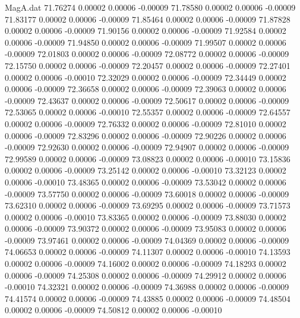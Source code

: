 \begin{filecontents}{MagA.dat}
  71.76274    0.00002    0.00006   -0.00009
  71.78580    0.00002    0.00006   -0.00009
  71.83177    0.00002    0.00006   -0.00009
  71.85464    0.00002    0.00006   -0.00009
  71.87828    0.00002    0.00006   -0.00009
  71.90156    0.00002    0.00006   -0.00009
  71.92584    0.00002    0.00006   -0.00009
  71.94850    0.00002    0.00006   -0.00009
  71.99507    0.00002    0.00006   -0.00009
  72.01803    0.00002    0.00006   -0.00009
  72.08772    0.00002    0.00006   -0.00009
  72.15750    0.00002    0.00006   -0.00009
  72.20457    0.00002    0.00006   -0.00009
  72.27401    0.00002    0.00006   -0.00010
  72.32029    0.00002    0.00006   -0.00009
  72.34449    0.00002    0.00006   -0.00009
  72.36658    0.00002    0.00006   -0.00009
  72.39063    0.00002    0.00006   -0.00009
  72.43637    0.00002    0.00006   -0.00009
  72.50617    0.00002    0.00006   -0.00009
  72.53065    0.00002    0.00006   -0.00010
  72.55357    0.00002    0.00006   -0.00009
  72.64557    0.00002    0.00006   -0.00009
  72.76332    0.00002    0.00006   -0.00009
  72.81010    0.00002    0.00006   -0.00009
  72.83296    0.00002    0.00006   -0.00009
  72.90226    0.00002    0.00006   -0.00009
  72.92630    0.00002    0.00006   -0.00009
  72.94907    0.00002    0.00006   -0.00009
  72.99589    0.00002    0.00006   -0.00009
  73.08823    0.00002    0.00006   -0.00010
  73.15836    0.00002    0.00006   -0.00009
  73.25142    0.00002    0.00006   -0.00010
  73.32123    0.00002    0.00006   -0.00010
  73.48365    0.00002    0.00006   -0.00009
  73.53042    0.00002    0.00006   -0.00009
  73.57750    0.00002    0.00006   -0.00009
  73.60018    0.00002    0.00006   -0.00009
  73.62310    0.00002    0.00006   -0.00009
  73.69295    0.00002    0.00006   -0.00009
  73.71573    0.00002    0.00006   -0.00010
  73.83365    0.00002    0.00006   -0.00009
  73.88030    0.00002    0.00006   -0.00009
  73.90372    0.00002    0.00006   -0.00009
  73.95083    0.00002    0.00006   -0.00009
  73.97461    0.00002    0.00006   -0.00009
  74.04369    0.00002    0.00006   -0.00009
  74.06653    0.00002    0.00006   -0.00009
  74.11307    0.00002    0.00006   -0.00010
  74.13593    0.00002    0.00006   -0.00009
  74.16002    0.00002    0.00006   -0.00009
  74.18293    0.00002    0.00006   -0.00009
  74.25308    0.00002    0.00006   -0.00009
  74.29912    0.00002    0.00006   -0.00010
  74.32321    0.00002    0.00006   -0.00009
  74.36988    0.00002    0.00006   -0.00009
  74.41574    0.00002    0.00006   -0.00009
  74.43885    0.00002    0.00006   -0.00009
  74.48504    0.00002    0.00006   -0.00009
  74.50812    0.00002    0.00006   -0.00010

\end{filecontents}
